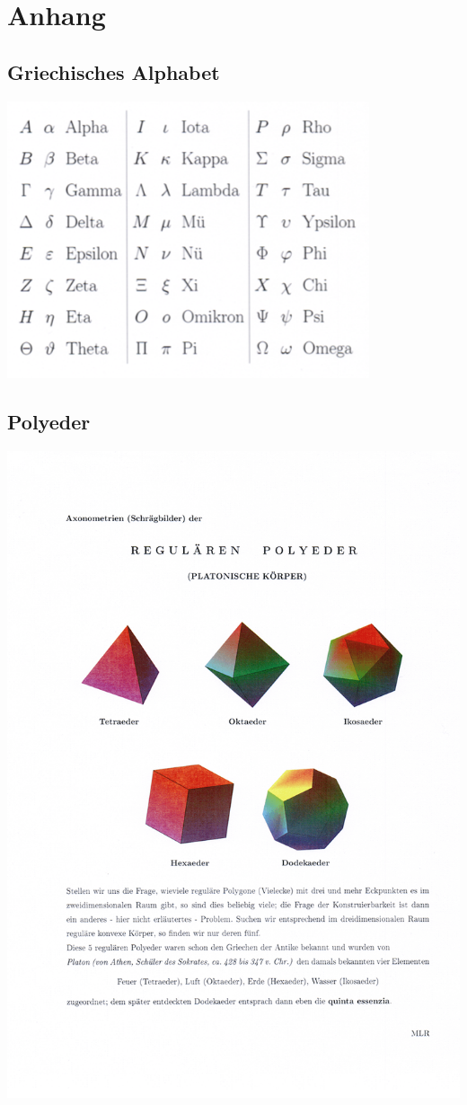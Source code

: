 \documentclass[a4paper,10pt]{report}
\begin{document}
 \chapter{Anhang}
 \section{Griechisches Alphabet}
 \begin{center}
	 \includegraphics[width=0.8\textwidth]{imgs/griechisches_alphabet.png}
 \end{center}
  \section{Polyeder}
 \begin{center}
	 \includegraphics[width=\textwidth]{imgs/polyeder.png}
 \end{center}
 \newpage
\end{document}
